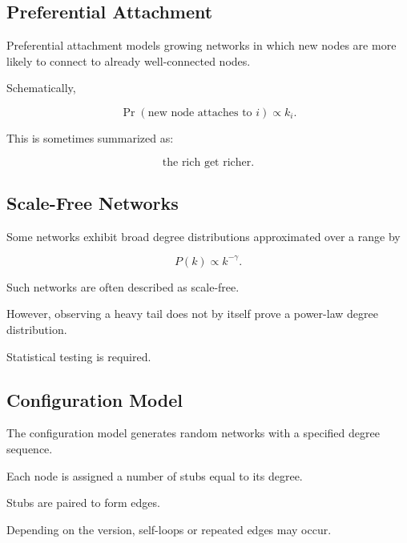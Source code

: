 \subsection{Preferential Attachment}
\label{subsec:preferential-attachment}

Preferential attachment models growing networks in which new nodes are more
likely to connect to already well-connected nodes.

Schematically,

\[
\boxed{
\Pr(\text{new node attaches to }i)
\propto
k_i.
}
\]

This is sometimes summarized as:

\[
\boxed{
\text{the rich get richer}.
}
\]

\subsection{Scale-Free Networks}
\label{subsec:scale-free-networks}

Some networks exhibit broad degree distributions approximated over a range by

\[
\boxed{
P(k)
\propto
k^{-\gamma}.
}
\]

Such networks are often described as scale-free.

However, observing a heavy tail does not by itself prove a power-law degree
distribution.

Statistical testing is required.

\subsection{Configuration Model}
\label{subsec:configuration-model}

The configuration model generates random networks with a specified degree
sequence.

Each node is assigned a number of stubs equal to its degree.

Stubs are paired to form edges.

Depending on the version, self-loops or repeated edges may occur.

